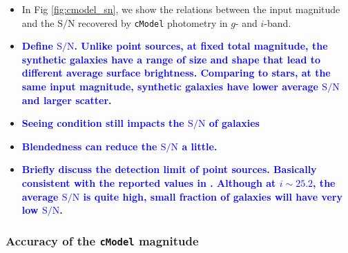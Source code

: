\documentclass[useamsfonts]{pasj01}
\def\cmodel{\texttt{cModel}}
\newcommand{\plan}[1]{\textcolor{blue} {\textbf{#1}}}
\begin{document}
    \begin{itemize}

        \item In Fig \ref{fig:cmodel_sn}, we show the relations between the input
            magnitude and the $\mathrm{S}/\mathrm{N}$ recovered by \cmodel{}
            photometry in $g$- and $i$-band.

        \item \plan{Define $\mathrm{S}/\mathrm{N}$.
                    Unlike point sources, at fixed total magnitude, the
                    synthetic galaxies have a range of size and shape that
                    lead to different average surface brightness.
                    Comparing to stars, at the same input magnitude, synthetic
                    galaxies have lower average $\mathrm{S}/\mathrm{N}$ and larger
                    scatter. }

        \item \plan{Seeing condition still impacts the $\mathrm{S}/\mathrm{N}$ of
                    galaxies}

        \item \plan{Blendedness can reduce the $\mathrm{S}/\mathrm{N}$ a little.}

        \item \plan{Briefly discuss the detection limit of point sources.
            Basically consistent with the reported values in \citet{HSCDR1}.
            Although at $i{\sim}25.2$, the average $\mathrm{S}/\mathrm{N}$ is quite high,
            small fraction of galaxies will have very low $\mathrm{S}/\mathrm{N}$.}

    \end{itemize}

\subsubsection{Accuracy of the \cmodel{} magnitude}
\end{document}
